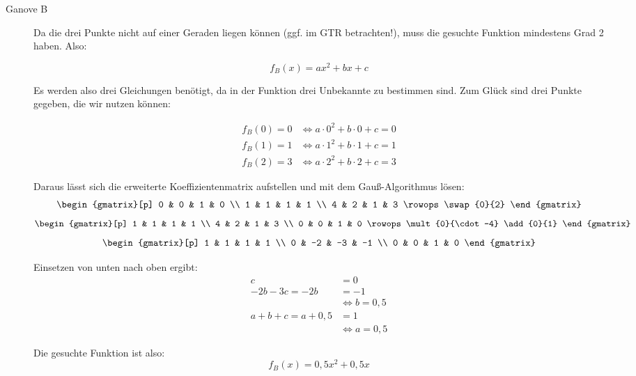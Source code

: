 \documentclass[11pt, a4paper, landscape, twocolumn]{scrartcl}
\begin{document}
\begin{aufgabe}
\begin{loesung}
\begin{description}
				\item[Ganove B]
				Da die drei Punkte nicht auf einer Geraden liegen können (ggf. im GTR betrachten!), muss die gesuchte Funktion mindestens Grad 2 haben. Also:
				
				\[ f_B(x) = ax^2 + bx + c \]
				
				Es werden also drei Gleichungen benötigt, da in der Funktion drei Unbekannte zu bestimmen sind. Zum Glück sind drei Punkte gegeben, die wir nutzen können:
				
				\begin{align*}
					f_B(0) = 0 &\Leftrightarrow a\cdot 0^2 + b\cdot 0 + c = 0 \\
					f_B(1) = 1 &\Leftrightarrow a\cdot 1^2 + b\cdot 1 + c = 1 \\
					f_B(2) = 3 &\Leftrightarrow a\cdot 2^2 + b\cdot 2 + c = 3
				\end{align*}
				
				Daraus lässt sich die erweiterte Koeffizientenmatrix aufstellen und mit dem Gauß-Algorithmus lösen:
				\[ \begin{gmatrix}[p]
				0 & 0 & 1 & 0 \\ 
				1 & 1 & 1 & 1 \\
				4 & 2 & 1 & 3
				\rowops
				\swap{0}{2}
				\end{gmatrix} \]
				\[ \begin{gmatrix}[p]
				1 & 1 & 1 & 1 \\
				4 & 2 & 1 & 3 \\
				0 & 0 & 1 & 0 
				\rowops
				\mult{0}{\cdot -4}
				\add{0}{1}
				\end{gmatrix} \]
				\[ \begin{gmatrix}[p]
				1 & 1 & 1 & 1 \\
				0 & -2 & -3 & -1 \\
				0 & 0 & 1 & 0 
				\end{gmatrix} \]
				
				Einsetzen von unten nach oben ergibt:
				\begin{align*}
				c &= 0 \\
				-2b - 3c = -2b &= -1 \\
				&\Leftrightarrow b = 0,5 \\
				a + b + c = a + 0,5 &= 1 \\
				&\Leftrightarrow a = 0,5
				\end{align*}
				
				Die gesuchte Funktion ist also:
				\[ f_B(x) = 0,5x^2 + 0,5x \]
				

\end{description}
\end{loesung}
\end{aufgabe}
\end{document}
